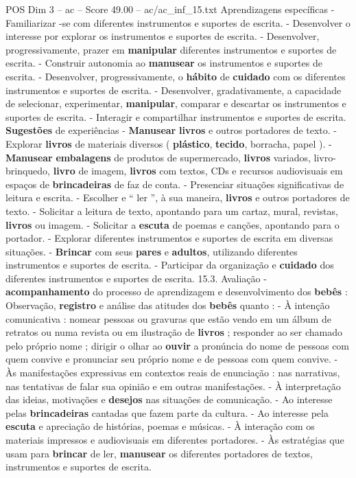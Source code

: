 \begin{textsample}{POS Dim 3 – ac – Score 49.00 – ac/ac\_inf\_15.txt}
Aprendizagens específicas - Familiarizar -se com diferentes instrumentos e suportes de escrita. - Desenvolver o interesse por explorar os instrumentos e suportes de escrita. - Desenvolver, progressivamente, prazer em \textbf{manipular} diferentes instrumentos e suportes de escrita. - Construir autonomia ao \textbf{manusear} os instrumentos e suportes de escrita. - Desenvolver, progressivamente, o \textbf{hábito} de \textbf{cuidado} com os diferentes instrumentos e suportes de escrita. - Desenvolver, gradativamente, a capacidade de selecionar, experimentar, \textbf{manipular}, comparar e descartar os instrumentos e suportes de escrita. - Interagir e compartilhar instrumentos e suportes de escrita. \textbf{Sugestões} de experiências - \textbf{Manusear} \textbf{livros} e outros portadores de texto. - Explorar \textbf{livros} de materiais diversos ( \textbf{plástico}, \textbf{tecido}, borracha, papel ). - \textbf{Manusear} \textbf{embalagens} de produtos de supermercado, \textbf{livros} variados, livro-brinquedo, \textbf{livro} de imagem, \textbf{livros} com textos, CDs e recursos audiovisuais em espaços de \textbf{brincadeiras} de faz de conta. - Presenciar situações significativas de leitura e escrita. - Escolher e “ ler ”, à sua maneira, \textbf{livros} e outros portadores de texto. - Solicitar a leitura de texto, apontando para um cartaz, mural, revistas, \textbf{livros} ou imagem. - Solicitar a \textbf{escuta} de poemas e canções, apontando para o portador. - Explorar diferentes instrumentos e suportes de escrita em diversas situações. - \textbf{Brincar} com seus \textbf{pares} e \textbf{adultos}, utilizando diferentes instrumentos e suportes de escrita. - Participar da organização e \textbf{cuidado} dos diferentes instrumentos e suportes de escrita. 15.3.
Avaliação - \textbf{acompanhamento} do processo de aprendizagem e desenvolvimento dos \textbf{bebês} : Observação, \textbf{registro} e análise das atitudes dos \textbf{bebês} quanto : - À intenção comunicativa : nomear pessoas ou gravuras que estão vendo em um álbum de retratos ou numa revista ou em ilustração de \textbf{livros} ; responder ao ser chamado pelo próprio nome ; dirigir o olhar ao \textbf{ouvir} a pronúncia do nome de pessoas com quem convive e pronunciar seu próprio nome e de pessoas com quem convive. - Às manifestações expressivas em contextos reais de enunciação : nas narrativas, nas tentativas de falar sua opinião e em outras manifestações. - À interpretação das ideias, motivações e \textbf{desejos} nas situações de comunicação. - Ao interesse pelas \textbf{brincadeiras} cantadas que fazem parte da cultura. - Ao interesse pela \textbf{escuta} e apreciação de histórias, poemas e músicas. - À interação com os materiais impressos e audiovisuais em diferentes portadores. - Às estratégias que usam para \textbf{brincar} de ler, \textbf{manusear} os diferentes portadores de textos, instrumentos e suportes de escrita.


\end{textsample}
